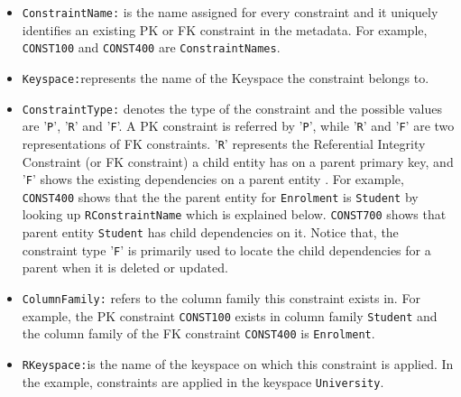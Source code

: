 \begin{itemize}
  
  \item \texttt{ConstraintName:} is the name assigned for
  every constraint and it uniquely identifies an
  existing \ac{PK} or \ac{FK} constraint in the metadata. 
   For example,  \texttt{CONST100} and \texttt{CONST400} are 
  \texttt{ConstraintNames}.
  
  \item \texttt{Keyspace:}represents the name of the Keyspace the constraint
  belongs to. 
  
  \item \texttt{ConstraintType:} denotes the type of the constraint and the
  possible values are '\texttt{P}', '\texttt{R}' and '\texttt{F}'.
	A \ac{PK} constraint is referred by '\texttt{P}', while '\texttt{R}' and
	'\texttt{F}' are two representations of \ac{FK} constraints.
	'\texttt{R}' represents the Referential Integrity Constraint (or  \ac{FK}
	constraint) a child entity has on a parent primary key, and '\texttt{F}' shows
	the  existing dependencies on a parent entity .
	For example, \texttt{CONST400} shows that the the parent entity for
	\texttt{Enrolment} is \texttt{Student} by looking up \texttt{RConstraintName}
	which is explained below. \texttt{CONST700} shows that parent entity
	\texttt{Student} has child dependencies on it. Notice that, the constraint type
	'\texttt{F}' is primarily used to locate the child dependencies for a parent
	when it is deleted or updated.

   
  \item \texttt{ColumnFamily:} refers to the column family this constraint
  exists in. For example,  the \ac{PK} constraint
  \texttt{CONST100}  exists in column family \texttt{Student} and the column
  family of the \ac{FK} constraint \texttt{CONST400}
  is \texttt{Enrolment}.
  
  \item \texttt{RKeyspace:}is the name of the keyspace on which this constraint
  is applied.  In the example, constraints  are applied in  the keyspace
  \texttt{University}.
  

\end{itemize}

